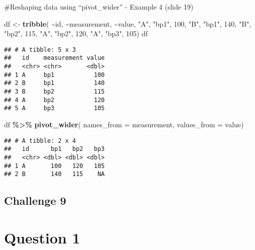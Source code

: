 \documentclass[
]{article}
\newenvironment{Shaded}{\begin{snugshade}}{\end{snugshade}}
\newcommand{\AttributeTok}[1]{\textcolor[rgb]{0.13,0.29,0.53}{#1}}
\newcommand{\DecValTok}[1]{\textcolor[rgb]{0.00,0.00,0.81}{#1}}
\newcommand{\FunctionTok}[1]{\textcolor[rgb]{0.13,0.29,0.53}{\textbf{#1}}}
\newcommand{\NormalTok}[1]{#1}
\newcommand{\OtherTok}[1]{\textcolor[rgb]{0.56,0.35,0.01}{#1}}
\newcommand{\SpecialCharTok}[1]{\textcolor[rgb]{0.81,0.36,0.00}{\textbf{#1}}}
\newcommand{\StringTok}[1]{\textcolor[rgb]{0.31,0.60,0.02}{#1}}
\begin{document}
\#Reshaping data using ``pivot\_wider'' - Example 4 (slide 19)

\begin{Shaded}
\begin{Highlighting}[]
\NormalTok{df }\OtherTok{\textless{}{-}} \FunctionTok{tribble}\NormalTok{(}
 \SpecialCharTok{\textasciitilde{}}\NormalTok{id, }\SpecialCharTok{\textasciitilde{}}\NormalTok{measurement, }\SpecialCharTok{\textasciitilde{}}\NormalTok{value,}
 \StringTok{"A"}\NormalTok{, }\StringTok{"bp1"}\NormalTok{, }\DecValTok{100}\NormalTok{,}
 \StringTok{"B"}\NormalTok{, }\StringTok{"bp1"}\NormalTok{, }\DecValTok{140}\NormalTok{,}
 \StringTok{"B"}\NormalTok{, }\StringTok{"bp2"}\NormalTok{, }\DecValTok{115}\NormalTok{,}
 \StringTok{"A"}\NormalTok{, }\StringTok{"bp2"}\NormalTok{, }\DecValTok{120}\NormalTok{,}
 \StringTok{"A"}\NormalTok{, }\StringTok{"bp3"}\NormalTok{, }\DecValTok{105}\NormalTok{)}
\NormalTok{df}
\end{Highlighting}
\end{Shaded}

\begin{verbatim}
## # A tibble: 5 x 3
##   id    measurement value
##   <chr> <chr>       <dbl>
## 1 A     bp1           100
## 2 B     bp1           140
## 3 B     bp2           115
## 4 A     bp2           120
## 5 A     bp3           105
\end{verbatim}

\begin{Shaded}
\begin{Highlighting}[]
\NormalTok{df }\SpecialCharTok{\%\textgreater{}\%}
 \FunctionTok{pivot\_wider}\NormalTok{(}
 \AttributeTok{names\_from =}\NormalTok{ measurement,}
 \AttributeTok{values\_from =}\NormalTok{ value)}
\end{Highlighting}
\end{Shaded}

\begin{verbatim}
## # A tibble: 2 x 4
##   id      bp1   bp2   bp3
##   <chr> <dbl> <dbl> <dbl>
## 1 A       100   120   105
## 2 B       140   115    NA
\end{verbatim}

\hypertarget{challenge-9}{%
\subsection{Challenge 9}\label{challenge-9}}

\hypertarget{question-1}{%
\section{Question 1}\label{question-1}}
\end{document}

